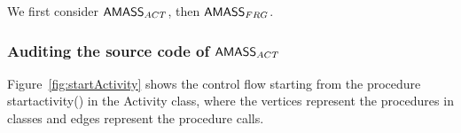 We first consider $\textsf{AMASS}_{ACT}$, then $\textsf{AMASS}_{FRG}$. 
%

\subsubsection{Auditing the source code of $\textsf{AMASS}_{ACT}$}
Figure~\ref{fig:startActivity} shows the control flow starting from the procedure startactivity() in the Activity class, 
where the vertices represent the procedures in classes and edges represent the procedure calls. 

